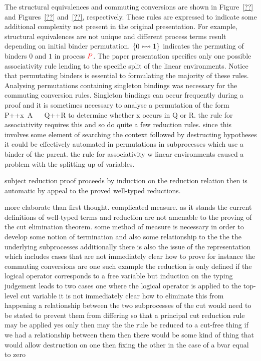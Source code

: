 %

%

The structural equivalences and commuting conversions are shown in
Figure~\ref{??} and Figures~\ref{??} and~\ref{??}, respectively. These rules
are expressed to indicate some additional complexity not present in the
original presentation. For example, structural equivalences are not unique and
different process terms result depending on initial binder
permutation. $\left\{{0}\leftrightsquigarrow{1}\right\}$ indicates the permuting of binders $0$ and $1$ in
process ${\color{red} P}$. The paper presentation specifies only one possible
associativity rule lending to the specific split of the linear environments.
Notice that permutating binders is essential to formulating the majority of
these rules. Analysing permutations containing singleton bindings was
necessary for the commuting conversion rules. Singleton bindings can occur
frequently during a proof and it is sometimes necessary to analyse a
permutation of the form P++x~A ~~ Q++R to determine whether x occurs in Q or
R. the rule for associativity requires this and so do quite a few reduction
rules. since this involves some element of searching the context followed by
destructing hypotheses it could be effectively automated in permutations in
subprocesses which use a binder of the parent. the rule for associativity w
linear environments caused a problem with the splitting up of variables.


subject reduction proof proceeds by induction on the reduction relation then
is automatic by appeal to the proved well-typed reductions.


more elaborate than first thought. complicated measure.  as it stands the
current definitions of well-typed terms and reduction are not amenable to the
proving of the cut elimination theorem. some method of measure is necessary in
order to develop some notion of termination and also some relationship to the
the the underlying subprocesses additionally there is also the issue of the
representation which includes cases that are not immediately clear how to
prove for instance the commuting conversions are one such example the
reduction is only defined if the logical operator corresponds to a free
variable but induction on the typing judgement leads to two cases one where
the logical operator is applied to the top-level cut variable it is not
immediately clear how to eliminate this from happening a relationship between
the two subprocesses of the cut would need to be stated to prevent them from
differing so that a principal cut reduction rule may be applied yes only then
may the the rule be reduced to a cut-free thing if we had a relationship
between them then there would be some kind of thing that would allow
destruction on one then fixing the other in the case of a bvar equal to zero

